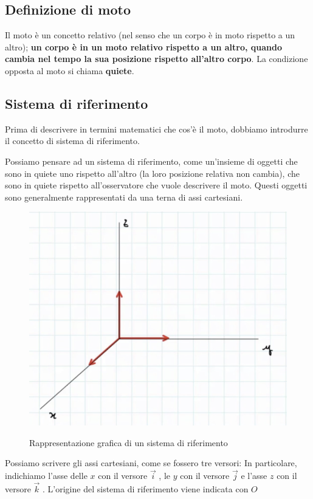\documentclass[a4paper]{book}
\begin{document}
\subsection{Definizione di moto}
Il moto è un concetto relativo (nel senso che un corpo è in moto rispetto a un altro); \textbf{un corpo è in un moto relativo rispetto a un altro, quando cambia nel tempo la sua posizione rispetto all'altro corpo}. La condizione opposta al moto si chiama \textbf{quiete}. 

\subsection{Sistema di riferimento}
Prima di descrivere in termini matematici che cos'è il moto, dobbiamo introdurre il concetto di sistema di riferimento.

Possiamo pensare ad un sistema di riferimento, come un'insieme di oggetti che sono in quiete uno rispetto all'altro (la loro posizione relativa non cambia), che sono in quiete rispetto all'osservatore che vuole descrivere il moto. 
\newpage
Questi oggetti sono generalmente rappresentati da una terna di assi cartesiani.

\begin{figure}[h]
\begin{center}
\includegraphics[width = 0.5 \textwidth]{sistema riferimento1}
\label{fig:riferimento1}
\caption{Rappresentazione grafica di un sistema di riferimento}
\end{center}
\end{figure}

Possiamo scrivere gli assi cartesiani, come se fossero tre versori: In particolare, indichiamo l'asse delle $ x $ con il versore $ \overrightarrow{i} $ , le $ y $ con il versore $ \overrightarrow{j} $ e l'asse $ z $ con il versore $ \overrightarrow{k} $ .
L'origine del sistema di riferimento viene indicata con $ O $
\end{document}
